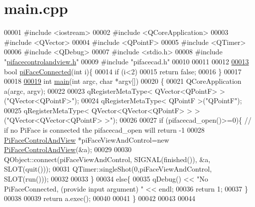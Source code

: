 \hypertarget{PiFace-Interface_2main_8cpp_source}{}\section{main.\+cpp}
\label{PiFace-Interface_2main_8cpp_source}

\begin{DoxyCode}
00001 \textcolor{preprocessor}{#include <iostream>}
00002 \textcolor{preprocessor}{#include <QCoreApplication>}
00003 \textcolor{preprocessor}{#include <QVector>}
00004 \textcolor{preprocessor}{#include <QPointF>}
00005 \textcolor{preprocessor}{#include <QTimer>}
00006 \textcolor{preprocessor}{#include <QDebug>}
00007 \textcolor{preprocessor}{#include <stdio.h>}
00008 \textcolor{preprocessor}{#include "\hyperlink{pifacecontrolandview_8h}{pifacecontrolandview.h}"}
00009 \textcolor{preprocessor}{#include "pifacecad.h"}
00010 
00011 
00012 
\hypertarget{PiFace-Interface_2main_8cpp_source.tex_l00013}{}\hyperlink{PiFace-Interface_2main_8cpp_a1b0b7c662f8b2e55151eb0a4e0292ea2}{00013} \textcolor{keywordtype}{bool} \hyperlink{PiFace-Interface_2main_8cpp_a1b0b7c662f8b2e55151eb0a4e0292ea2}{piFaceConnected}(\textcolor{keywordtype}{int} i)\{
00014     \textcolor{keywordflow}{if} (i<2)
00015         \textcolor{keywordflow}{return} \textcolor{keyword}{false};
00016 \}
00017 
00018 
\hypertarget{PiFace-Interface_2main_8cpp_source.tex_l00019}{}\hyperlink{PiFace-Interface_2main_8cpp_a0ddf1224851353fc92bfbff6f499fa97}{00019} \textcolor{keywordtype}{int} \hyperlink{main_8cpp_a0ddf1224851353fc92bfbff6f499fa97}{main}(\textcolor{keywordtype}{int} argc, \textcolor{keywordtype}{char} *argv[])
00020 \{
00021     QCoreApplication a(argc, argv);
00022 
00023     qRegisterMetaType< QVector<QPointF> >(\textcolor{stringliteral}{"QVector<QPointF>"});
00024     qRegisterMetaType< QPointF >(\textcolor{stringliteral}{"QPointF"});
00025     qRegisterMetaType< QVector<QVector<QPointF> > >(\textcolor{stringliteral}{"QVector<QVector<QPointF> >"});
00026 
00027     \textcolor{keywordflow}{if} (pifacecad\_open()>=0)\{    \textcolor{comment}{// if no PiFace is connected the pifacecad\_open will return -1}
00028         \hyperlink{classPiFaceControlAndView}{PiFaceControlAndView} *piFaceViewAndControl=\textcolor{keyword}{new} 
      \hyperlink{classPiFaceControlAndView}{PiFaceControlAndView}(&a);
00029 
00030         QObject::connect(piFaceViewAndControl, SIGNAL(finished()), &a, SLOT(quit()));
00031         QTimer::singleShot(0,piFaceViewAndControl, SLOT(run()));
00032 
00033     \}
00034     \textcolor{keywordflow}{else}\{
00035        qDebug() << \textcolor{stringliteral}{"No PiFaceConnected, (provide input argument) "} << endl;
00036        \textcolor{keywordflow}{return} 1;
00037     \}
00038 
00039     \textcolor{keywordflow}{return} a.exec();
00040 
00041 \}
00042 
00043 
00044 
\end{DoxyCode}
